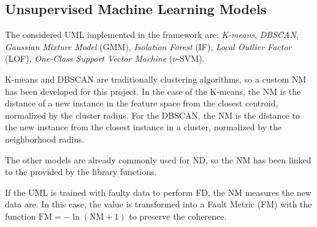 \subsection{Unsupervised Machine Learning Models}

The considered UML implemented in the framework are: \emph{K-means}, \emph{DBSCAN}, \emph{Gaussian Mixture Model} (GMM), \emph{Isolation Forest} (IF), \emph{Local Outlier Factor} (LOF), \emph{One-Class Support Vector Machine} ($\nu$-SVM).

K-means and DBSCAN are traditionally clustering algorithms, so a custom NM has been developed for this project. In the case of the K-means, the NM is the distance of a new instance in the feature space from the closest centroid, normalized by the cluster radius. For the DBSCAN, the NM is the distance to the new instance from the closest instance in a cluster, normalized by the neighborhood radius.

The other models are already commonly used for ND, so the NM has been linked to the  provided by the library functions.

If the UML is trained with faulty data to perform FD, the NM measures  the new data are. In this case, the value is transformed into a Fault Metric (FM) with the function $\text{FM} = - \ln(\text{NM} + 1)$ to preserve the coherence. 